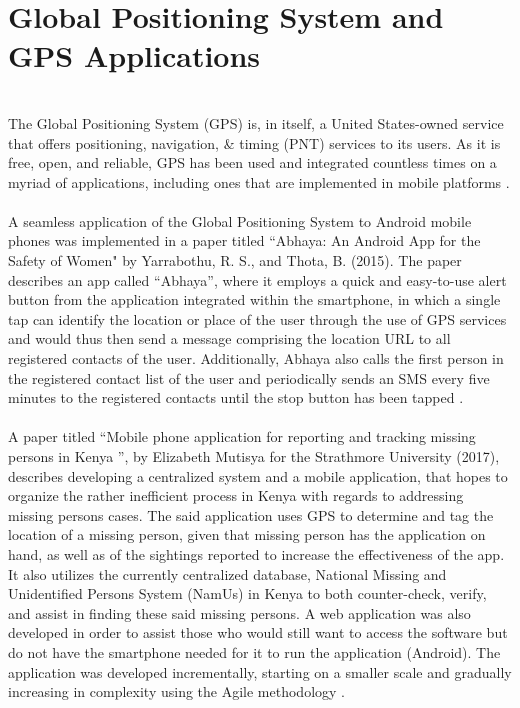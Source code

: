 \section{Global Positioning System and GPS Applications}

\\The Global Positioning System (GPS) is, in itself, a United States-owned service that offers positioning, navigation, & timing (PNT) services to its users. As it is free, open, and reliable, GPS has been used and integrated countless times on a myriad of applications, including ones that are implemented in mobile platforms \cite{gpsGov}.
\\\\A seamless application of the Global Positioning System to Android mobile phones was implemented in a paper titled “Abhaya: An Android App for the Safety of Women" by Yarrabothu, R. S., and Thota, B. (2015). The paper describes an app called “Abhaya”, where it employs a quick and easy-to-use alert button from the application integrated within the smartphone, in which a single tap can identify the location or place of the user through the use of GPS services and would thus then send a message comprising the location URL to all registered contacts of the user. Additionally, Abhaya also calls the first person in the registered contact list of the user and periodically sends an SMS every five minutes to the registered contacts until the stop button has been tapped \cite{yarrabothu2015abhaya}.
\\\\A paper titled “Mobile phone application for reporting and tracking missing persons in Kenya ”, by Elizabeth Mutisya for the Strathmore University (2017), describes developing a centralized system and a mobile application, that hopes to organize the rather inefficient process in Kenya with regards to addressing missing persons cases. The said application uses GPS to determine and tag the location of a missing person, given that missing person has the application on hand, as well as of the sightings reported to increase the effectiveness of the app. It also utilizes the currently centralized database, National Missing and Unidentified Persons System (NamUs) in Kenya to both counter-check, verify, and assist in finding these said missing persons. A web application was also developed in order to assist those who would still want to access the software but do not have the smartphone needed for it to run the application (Android). The application was developed incrementally, starting on a smaller scale and gradually increasing in complexity using the Agile methodology \cite{mutisya2017mobile}.
